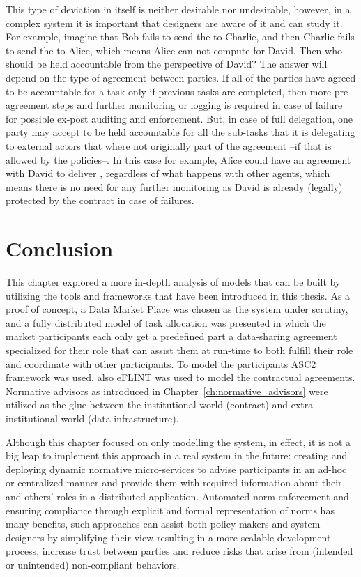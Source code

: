 This type of deviation in itself is neither desirable nor undesirable, however, in a complex system it is important that designers are aware of it and can study it. For example, imagine that Bob fails to send the  to Charlie, and then Charlie fails to send the  to Alice, which means Alice can not compute  for David. Then who should be held accountable from the perspective of David? The answer will depend on the type of agreement between parties. If all of the parties have agreed to be accountable for a task only if previous tasks are completed, then more pre-agreement steps \cite{Baldoni2018} and further monitoring or logging is required in case of failure for possible ex-post auditing and enforcement. But, in case of full delegation, one party may accept to be held accountable for all the sub-tasks that it is delegating to external actors that where not originally part of the agreement --if that is allowed by the policies--. In this case for example, Alice could have an agreement with David to deliver , regardless of what happens with other agents, which means there is no need for any further monitoring as David is already (legally) protected by the contract in case of failures.

\section{Conclusion}
This chapter explored a more in-depth analysis of models that can be built by utilizing the tools and frameworks that have been introduced in this thesis. As a proof of concept, a Data Market Place was chosen as the system under scrutiny, and a fully distributed model of task allocation was presented in which the market participants each only get a predefined part a data-sharing agreement specialized for their role that can assist them at run-time to both fulfill their role and coordinate with other participants. To model the participants ASC2 framework was used, also eFLINT was used to model the contractual agreements. Normative advisors as introduced in Chapter~\ref{ch:normative_advisors} were utilized as the glue between the institutional world (contract) and extra-institutional world (data infrastructure).

Although this chapter focused on only modelling the system, in effect, it is not a big leap to implement this approach in a real system in the future: creating and deploying dynamic normative micro-services to advise participants in an ad-hoc or centralized manner and provide them with required information about their and others' roles in a distributed application. Automated norm enforcement and ensuring compliance through explicit and formal representation of norms has many benefits, such approaches can assist both policy-makers and system designers by simplifying their view resulting in a more scalable development process, increase trust between parties and reduce risks that arise from (intended or unintended) non-compliant behaviors. 


